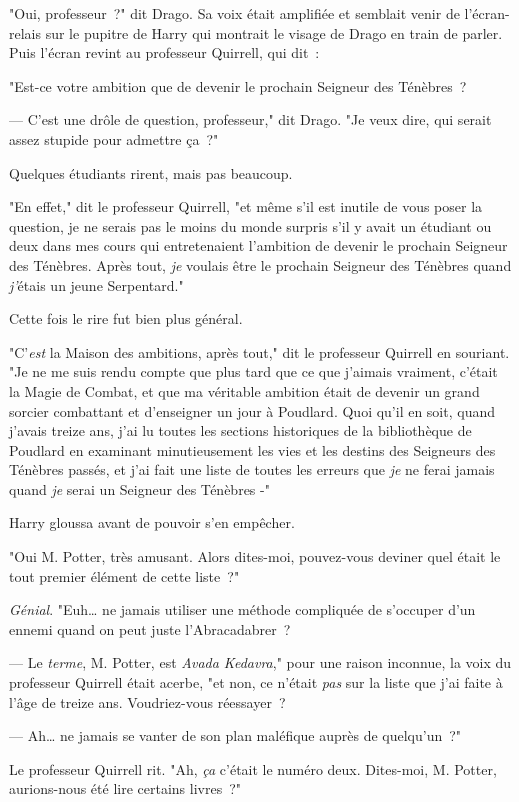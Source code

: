 "Oui, professeur~?" dit Drago. Sa voix était amplifiée et semblait venir de l'écran-relais sur le pupitre de Harry qui montrait le visage de Drago en train de parler. Puis l'écran revint au professeur Quirrell, qui dit~:

"Est-ce votre ambition que de devenir le prochain Seigneur des Ténèbres~?

--- C'est une drôle de question, professeur," dit Drago. "Je veux dire, qui serait assez stupide pour admettre ça~?"

Quelques étudiants rirent, mais pas beaucoup.

"En effet," dit le professeur Quirrell, "et même s'il est inutile de vous poser la question, je ne serais pas le moins du monde surpris s'il y avait un étudiant ou deux dans mes cours qui entretenaient l'ambition de devenir le prochain Seigneur des Ténèbres. Après tout, \emph{je} voulais être le prochain Seigneur des Ténèbres quand \emph{j'}étais un jeune Serpentard."

Cette fois le rire fut bien plus général.

"C'\emph{est} la Maison des ambitions, après tout," dit le professeur Quirrell en souriant. "Je ne me suis rendu compte que plus tard que ce que j'aimais vraiment, c'était la Magie de Combat, et que ma véritable ambition était de devenir un grand sorcier combattant et d'enseigner un jour à Poudlard. Quoi qu'il en soit, quand j'avais treize ans, j'ai lu toutes les sections historiques de la bibliothèque de Poudlard en examinant minutieusement les vies et les destins des Seigneurs des Ténèbres passés, et j'ai fait une liste de toutes les erreurs que \emph{je} ne ferai jamais quand \emph{je} serai un Seigneur des Ténèbres -"

Harry gloussa avant de pouvoir s'en empêcher.

"Oui M. Potter, très amusant. Alors dites-moi, pouvez-vous deviner quel était le tout premier élément de cette liste~?"

\emph{Génial}. "Euh… ne jamais utiliser une méthode compliquée de s'occuper d'un ennemi quand on peut juste l'Abracadabrer~?

--- Le \emph{terme}, M. Potter, est \emph{Avada Kedavra}," pour une raison inconnue, la voix du professeur Quirrell était acerbe, "et non, ce n'était \emph{pas} sur la liste que j'ai faite à l'âge de treize ans. Voudriez-vous réessayer~?

--- Ah… ne jamais se vanter de son plan maléfique auprès de quelqu'un~?"

Le professeur Quirrell rit. "Ah, \emph{ça} c'était le numéro deux. Dites-moi, M. Potter, aurions-nous été lire certains livres~?"

